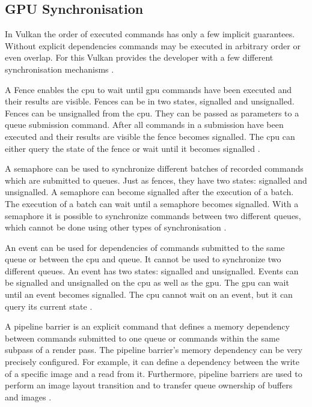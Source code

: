 

\subsection{GPU Synchronisation}
\label{section:synchronisation}
In Vulkan the order of executed commands has only a few implicit guarantees. Without explicit dependencies commands may be executed in arbitrary order or even overlap. For this Vulkan provides the developer with a few different synchronisation mechanisms \cite{khronos:vulkan:spec1.1}.

A Fence enables the \gls{cpu} to wait until \gls{gpu} commands have been executed and their results are visible. Fences can be in two states, signalled and unsignalled. Fences can be unsignalled from the \gls{cpu}. They can be passed as parameters to a queue submission command. After all commands in a submission have been executed and their results are visible the fence becomes signalled. The \gls{cpu} can either query the state of the fence or wait until it becomes signalled \cite{khronos:vulkan:spec1.1}.

A semaphore can be used to synchronize different batches of recorded commands which are submitted to queues. Just as fences, they have two states: signalled and unsignalled. A semaphore can become signalled after the execution of a batch. The execution of a batch can wait until a semaphore becomes signalled. With a semaphore it is possible to synchronize commands between two different queues, which cannot be done using other types of synchronisation \cite{khronos:vulkan:spec1.1}.

An event can be used for dependencies of commands submitted to the same queue or between the \gls{cpu} and queue. It cannot be used to synchronize two different queues. An event has two states: signalled and unsignalled. Events can be signalled and unsignalled on the \gls{cpu} as well as the \gls{gpu}. The \gls{gpu} can wait until an event becomes signalled. The \gls{cpu} cannot wait on an event, but it can query its current state \cite{khronos:vulkan:spec1.1}.

A pipeline barrier is an explicit command that defines a memory dependency between commands submitted to one queue or commands within the same subpass of a render pass. The pipeline barrier's memory dependency can be very precisely configured. For example, it can define a dependency between the write of a specific image and a read from it. Furthermore, pipeline barriers are used to perform an image layout transition and to transfer queue ownership of buffers and images \cite{khronos:vulkan:spec1.1}.


